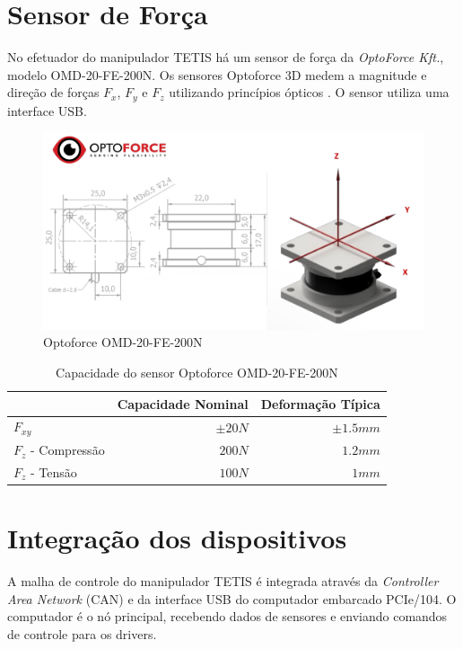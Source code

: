 \section{Sensor de Força} \label{sec:optoforce}

No efetuador do manipulador TETIS há um sensor de força da \textit{OptoForce Kft.}, modelo OMD-20-FE-200N. Os sensores Optoforce 3D medem a magnitude e direção de forças $F_x$, $F_y$ e $F_z$ utilizando princípios ópticos \citep{optoforce}. O sensor utiliza uma interface USB. 

\begin{figure}[!ht]
\centering
  \includegraphics[width=\linewidth]{./img/optoforce.png}
  \caption{Optoforce OMD-20-FE-200N \citep{optoforce}}
  \label{fig:optoforce}
\end{figure}%

\begin{table}[h!]
\centering
\caption{Capacidade do sensor Optoforce OMD-20-FE-200N}
\label{tab:dh_tetis}
\begin{tabular}{lrr} \hline
 &  Capacidade Nominal & Deformação Típica \\ \hline
 $F_{xy}$ & $\pm 20N$ & $\pm 1.5 mm$ \\
 $F_z $ - Compressão & $200N$ & $1.2 mm$ \\
 $F_z $ - Tensão & $100N$ & $1 mm$ \\
\hline
\end{tabular}
\end{table}


\section{Integração dos dispositivos}

A malha de controle do manipulador TETIS é integrada através da \textit{Controller Area Network} (CAN) e da interface USB do computador embarcado PCIe/104. O computador é o nó principal, recebendo dados de sensores e enviando comandos de controle para os drivers.

